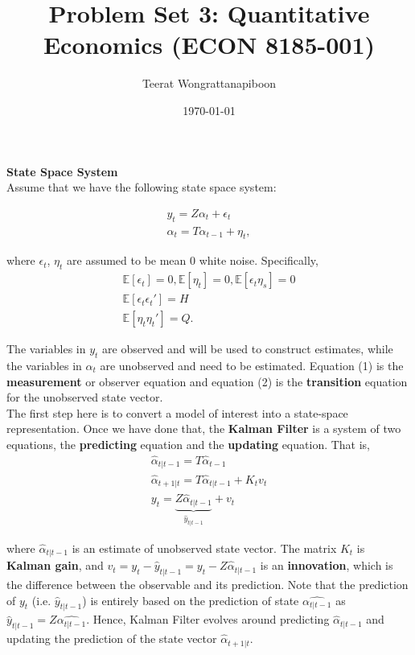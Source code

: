 \documentclass{article}
\title{Problem Set 3: Quantitative Economics (ECON 8185-001)}
\author{Teerat Wongrattanapiboon}
\date{\today}
\begin{document}
 
 	\maketitle
	
	\noindent\textbf{\Large State Space System} \\
	
	Assume that we have the following state space system:
	
	\begin{align}
		y_t = Z\alpha_t + \epsilon_t \\
		\alpha_t = T \alpha_{t-1} + \eta_t,
	\end{align}
	
	where $\epsilon_t$, $\eta_t$ are assumed to be mean $0$ white noise. Specifically,
	\begin{gather*}
		\mathds{E}[\epsilon_t] =0, \mathds{E}[\eta_t] =0, \mathds{E}[\epsilon_t \eta_s]=0\\
		\mathds{E}[\epsilon_t \epsilon_t'] = H \\
		\mathds{E}[\eta_t \eta_t'] = Q.
	\end{gather*}
 	
	The variables in $y_{t}$ are observed and will be used to construct estimates, while the variables in $\alpha_{t}$ are unobserved and need to be estimated. Equation (1) is the \textbf{measurement} or observer equation and equation (2) is the \textbf{transition} equation for the unobserved state vector. \\
	
	The first step here is to convert a model of interest into a state-space representation. Once we have done that, the \textbf{Kalman Filter} is a system of two equations, the \textbf{predicting} equation and the \textbf{updating} equation. That is,
	\begin{align}
		\hat{\alpha}_{t|t-1} = T \hat{\alpha}_{t-1}\\
		\hat{\alpha}_{t+1|t} = T \hat{\alpha}_{t|t-1} + K_t v_t \\
		y_t = \underbrace{Z \hat{\alpha}_{t|t-1}}_{\hat{y}_{t|t-1}} + v_t
	\end{align}  	
	
	where $\hat{\alpha}_{t|t-1}$ is an estimate of unobserved state vector. The matrix $K_t$ is \textbf{Kalman gain}, and $v_t = y_t - \hat{y}_{t|t-1} = y_t - Z \hat{\alpha}_{t|t-1} $ is an \textbf{innovation}, which is the difference between the observable and its prediction. Note that the prediction of $y_{t}$ (i.e. $\hat{y}_{t|t-1}$) is entirely based on the prediction of state $\hat{\alpha_{t|t-1}}$ as $\hat{y}_{t|t-1} = Z\hat{\alpha_{t|t-1}}$. Hence, Kalman Filter evolves around predicting $\hat{\alpha}_{t|t-1}$ and updating the prediction of the state vector $\hat{\alpha}_{t+1|t}$. \\
	
\end{document}
